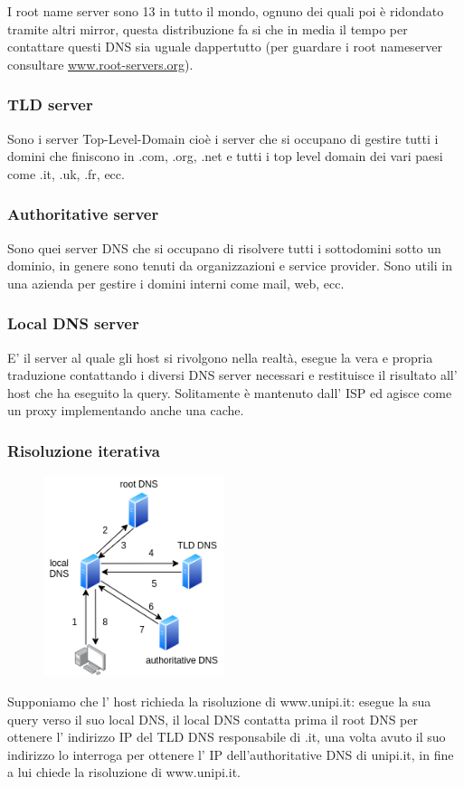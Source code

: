 I root name server sono 13 in tutto il mondo, ognuno dei quali poi è ridondato tramite altri mirror, questa distribuzione fa si che in media il tempo per contattare questi DNS sia uguale dappertutto (per guardare i root nameserver consultare \href{https://www.root-servers.org/}{www.root-servers.org}).

\subsubsection{TLD server}
Sono i server Top-Level-Domain cioè i server che si occupano di gestire tutti i domini che finiscono in .com, .org, .net e tutti i top level domain dei vari paesi come .it, .uk, .fr, ecc.

\subsubsection{Authoritative server}
Sono quei server DNS che si occupano di risolvere tutti i sottodomini sotto un dominio, in genere sono tenuti da organizzazioni e service provider.
Sono utili in una azienda per gestire i domini interni come mail, web, ecc.

\subsubsection{Local DNS server}
E' il server al quale gli host si rivolgono nella realtà, esegue la vera e propria traduzione contattando i diversi DNS server necessari e restituisce il risultato all' host che ha eseguito la query.
Solitamente è mantenuto dall' ISP ed agisce come un proxy implementando anche una cache.

\subsubsection{Risoluzione iterativa}
\begin{figure}[H]
    \centering
    \includegraphics[width=200px]{images/2_Applicazioni_di_rete/risoluzione_DNS.png}
\end{figure}
Supponiamo che l' host richieda la risoluzione di www.unipi.it: esegue la sua query verso il suo local DNS, il local DNS contatta prima il root DNS per ottenere l' indirizzo IP del TLD DNS responsabile di .it, una volta avuto il suo indirizzo lo interroga per ottenere l' IP dell'authoritative DNS di unipi.it, in fine a lui chiede la risoluzione di www.unipi.it.

